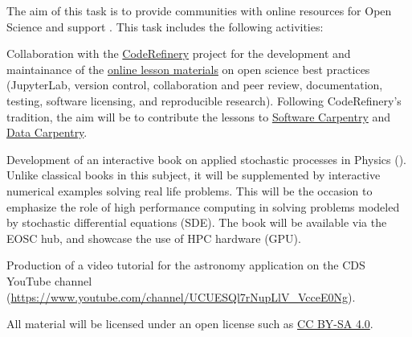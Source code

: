 \begin{task}[
  title=Online resources for open science,
  id=online-resources,
  lead=INSERM,
  PM=14,
  wphases={0-48!.3},
  partners={CDS,EP,QS,SIL,SRL,UPSUD,WTT,XFEL}
]
  The aim of this task is to provide communities with online resources for Open Science and support .
  This task includes the following activities:
  \begin{compactitem}
  \item Collaboration with the \href{https://coderefinery.org}{CodeRefinery} project for the development and maintainance of the \href{https://coderefinery.org/lessons/}{online lesson materials} on open science best practices (JupyterLab, version control, collaboration and peer review, documentation, testing, software licensing, and reproducible research).
    Following CodeRefinery's tradition, the aim will be to contribute the
    lessons to \href{https://software-carpentry.org/}{Software Carpentry}
    and \href{https://data-carpentry.org/}{Data Carpentry}.
\item Development of an interactive book on applied stochastic
  processes in Physics (). Unlike classical
  books in this subject, it will be supplemented by interactive
  numerical examples solving real life problems. This will be the
  occasion to emphasize the role of high performance computing in
  solving problems modeled by stochastic differential equations (SDE).
  The book will be available via the EOSC hub, and showcase the use of
  HPC hardware (GPU).
  \item Production of a video tutorial for the astronomy application on the 
      CDS YouTube channel (\url{https://www.youtube.com/channel/UCUESQl7rNupLlV_VcceE0Ng}).
  \end{compactitem}
  All material will be licensed under an open license such as
  \href{https://creativecommons.org/licenses/by-sa/4.0/}{CC BY-SA 4.0}.
\end{task}
